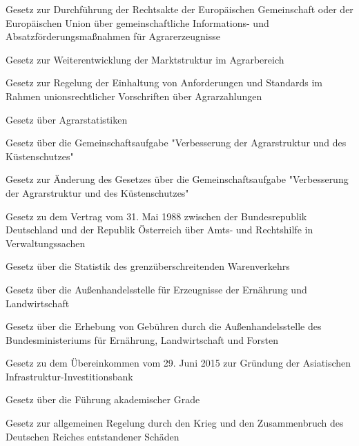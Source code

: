 \item[{AgrarAbsFDG}] Gesetz zur Durchführung der Rechtsakte der Europäischen Gemeinschaft oder der Europäischen Union über gemeinschaftliche Informations- und Absatzförderungsmaßnahmen für Agrarerzeugnisse

\item[{AgrarMSG}] Gesetz zur Weiterentwicklung der Marktstruktur im Agrarbereich

\item[{AgrarZahlVerpflG}] Gesetz zur Regelung der Einhaltung von Anforderungen und Standards im Rahmen unionsrechtlicher Vorschriften über Agrarzahlungen

\item[{AgrStatG}] Gesetz über Agrarstatistiken

\item[{AgrStruktG}] Gesetz über die Gemeinschaftsaufgabe "Verbesserung der Agrarstruktur und des Küstenschutzes"

\item[{AgrStruktGÄndG}] Gesetz zur Änderung des Gesetzes über die Gemeinschaftsaufgabe "Verbesserung der Agrarstruktur und des Küstenschutzes"

\item[{AHiVwVtrAUTG}] Gesetz zu dem Vertrag vom 31. Mai 1988 zwischen der Bundesrepublik Deutschland und der Republik Österreich über Amts- und Rechtshilfe in Verwaltungssachen

\item[{AHStatGes}] Gesetz über die Statistik des grenzüberschreitenden Warenverkehrs

\item[{AHStLwG}] Gesetz über die Außenhandelsstelle für Erzeugnisse der Ernährung und Landwirtschaft

\item[{AHStLwGebG}] Gesetz über die Erhebung von Gebühren durch die Außenhandelsstelle des Bundesministeriums für Ernährung, Landwirtschaft und Forsten

\item[{AIIBÜbkG}] Gesetz zu dem Übereinkommen vom 29. Juni 2015 zur Gründung der Asiatischen Infrastruktur-Investitionsbank

\item[{AkaGrG}] Gesetz über die Führung akademischer Grade

\item[{AKG}] Gesetz zur allgemeinen Regelung durch den Krieg und den Zusammenbruch des Deutschen Reiches entstandener Schäden

